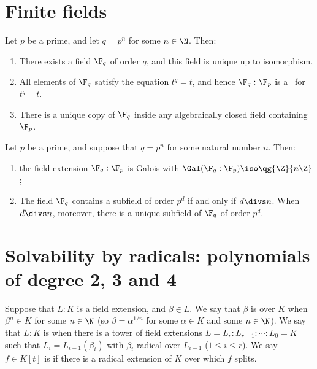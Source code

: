 \documentclass{article}
\begin{document}
\section{Finite fields}
  \begin{ttheorem}
    Let $ p $ be a prime, and let $ q=p^n $ for some $ n\in \N $.
    Then: \begin{enumerate}[label=(\alph*)]
      \item There exists a field $ \F_q $ of order $ q $, and this field is unique up to isomorphism.
      \item All elements of $ \F_q $ satisfy the equation $ t^q=t $, and hence $ \F_q:\F_p $ is a \sfe~for $ t^q-t $.
      \item There is a unique copy of $ \F_q $ inside any algebraically closed field containing $ \F_p $.
    \end{enumerate}
  \end{ttheorem}

  \begin{ttheorem}
    Let $ p $ be a prime, and suppose that $ q=p^n $ for some natural number $ n $.
    Then: \begin{enumerate}[label=(\alph*)]
      \item the field extension $ \F_q:\F_p $ is Galois with $ \Gal(\F_q:\F_p)\iso \qg{\Z}{n\Z} $;
      \item The field $ \F_q $ contains a subfield of order $ p^d $ if and only if $ d\divs n $.
        When $ d\divs n $, moreover, there is a unique subfield of $ \F_q $ of order $ p^d $.
    \end{enumerate}
  \end{ttheorem}

\section{Solvability by radicals: polynomials of degree 2, 3 and 4}
  \begin{tdefinition}
    Suppose that $ L:K $ is a field extension, and $ \beta\in L $.
    We say that $ \beta $ is  over $ K $ when $ \beta^n\in K $ for some $ n\in \N $ (so $ \beta=\alpha^{1/n} $ for some $ \alpha\in K $ and some $ n\in\N $).
    We say that $ L:K $ is  when there is a tower of field extensions $ L=L_r:L_{r-1}:\cdots:L_0=K $ such that $ L_i=L_{i-1}(\beta_i) $ with $ \beta_i $ radical over $ L_{i-1} $ ($ 1\leq i\leq r $).
    We say $ f\in K[t] $ is  if there is a radical extension of $ K $ over which $ f $ splits.
  \end{tdefinition}
\end{document}
